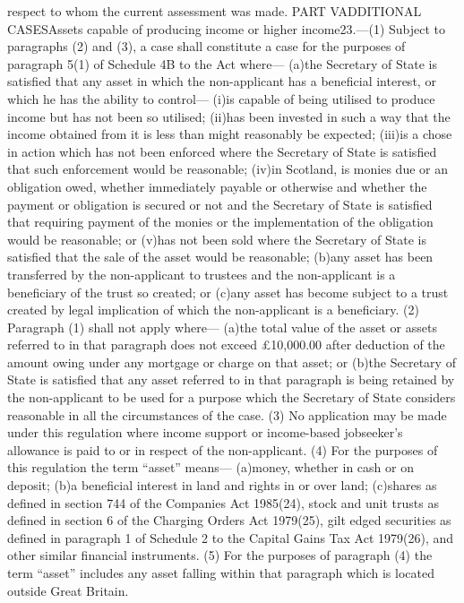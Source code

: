 \documentclass[a4paper]{article}
\begin{document}
respect to whom the current assessment was made.
PART VADDITIONAL CASESAssets capable of producing income or higher income23.—(1)
Subject to paragraphs (2) and (3), a case shall constitute a case for the
purposes of paragraph 5(1) of Schedule 4B to the Act where—
(a)the Secretary of State is satisfied that any asset in which the non-applicant
has a beneficial interest, or which he has the ability to control—
(i)is capable of being utilised to produce income but has not been so utilised;
(ii)has been invested in such a way that the income obtained from it is less
than might reasonably be expected;
(iii)is a chose in action which has not been enforced where the Secretary of
State is satisfied that such enforcement would be reasonable;
(iv)in Scotland, is monies due or an obligation owed, whether immediately
payable or otherwise and whether the payment or obligation is secured or not and
the Secretary of State is satisfied that requiring payment of the monies or the
implementation of the obligation would be reasonable; or
(v)has not been sold where the Secretary of State is satisfied that the sale of
the asset would be reasonable;
(b)any asset has been transferred by the non-applicant to trustees and the
non-applicant is a beneficiary of the trust so created; or
(c)any asset has become subject to a trust created by legal implication of which
the non-applicant is a beneficiary.
(2) Paragraph (1) shall not apply where—
(a)the total value of the asset or assets referred to in that paragraph does not
exceed £10,000.00 after deduction of the amount owing under any mortgage or
charge on that asset; or
(b)the Secretary of State is satisfied that any asset referred to in that
paragraph is being retained by the non-applicant to be used for a purpose which
the Secretary of State considers reasonable in all the circumstances of the
case.
(3) No application may be made under this regulation where income support or
income-based jobseeker’s allowance is paid to or in respect of the
non-applicant.
(4) For the purposes of this regulation the term “asset” means—
(a)money, whether in cash or on deposit;
(b)a beneficial interest in land and rights in or over land;
(c)shares as defined in section 744 of the Companies Act 1985(24), stock and
unit trusts as defined in section 6 of the Charging Orders Act 1979(25), gilt
edged securities as defined in paragraph 1 of Schedule 2 to the Capital Gains
Tax Act 1979(26), and other similar financial instruments.
(5) For the purposes of paragraph (4) the term “asset” includes any asset
falling within that paragraph which is located outside Great Britain.
\end{document}
